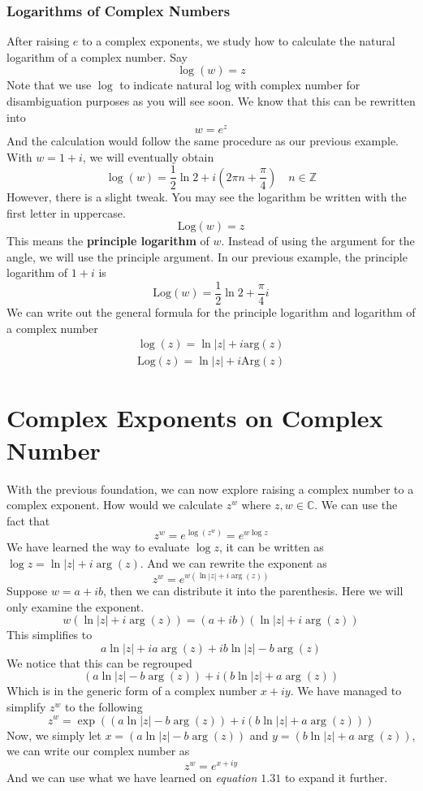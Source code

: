 \documentclass[12pt]{book}
\newcommand{\Z}{\mathbb{Z}}
\newcommand{\C}{\mathbb{C}}
\newcommand{\paren}[1]{\left( #1 \right)}
\newcommand{\abso}[1]{\left|#1 \right|}
\begin{document}
\subsubsection{Logarithms of Complex Numbers}
After raising $e$ to a complex exponents, we study how to calculate the natural logarithm of a complex number. Say
\begin{equation}
  \log\paren{w}=z 
\end{equation}
Note that we use $\log$ to indicate natural log with complex number for disambiguation purposes as you will see soon. We know that this can be rewritten into 
\[
w = e^z
\]
And the calculation would follow the same procedure as our previous example. With $w = 1+i$, we will eventually obtain 
\[
\log(w) = \frac{1}{2}\ln 2 + i \paren{2\pi n + \frac{\pi}{4}} \quad n\in \Z
\]
However, there is a slight tweak. You may see the logarithm be written with the first letter in uppercase.
\[
\text{Log}(w) = z
\]
This means the \textbf{principle logarithm} of $w$. Instead of using the argument for the angle, we will use the principle argument. In our previous example, the principle logarithm of $1+i$ is 
\[
\text{Log}(w) = \frac{1}{2}\ln 2 + \frac{\pi}{4}i
\]
We can write out the general formula for the principle logarithm and logarithm of a complex number
\begin{align}
    \log(z) = \ln \abso{z} + i \text{arg}(z)\\
    \text{Log}(z) = \ln \abso{z} + i \text{Arg}(z)
\end{align}


\section{Complex Exponents on Complex Number}
With the previous foundation, we can now explore raising a complex number to a complex exponent. How would we calculate $z^w$ where $ z,w \in \C$. We can use the fact that
\[
z^w = e^{\log\paren{z^w}} = e^{w\log z}
\]
We have learned the way to evaluate $\log z$, it can be written as $ \log z = \ln \abso{z} + i\arg(z)$. And we can rewrite the exponent as
\[
z^w = e^{w \paren{\ln \abso{z} + i\arg (z)}}
\]
Suppose $w = a+ib$, then we can distribute it into the parenthesis. Here we will only examine the exponent.
\[
w \paren{\ln \abso{z} + i\arg (z)}= \paren{a+ib} \paren{\ln \abso{z} + i\arg (z)} 
\]
This simplifies to
\[
a\ln\abso{z}+ia\arg(z) + ib\ln\abso{z}-b\arg(z)
\]
We notice that this can be regrouped
\[
\paren{a\ln\abso{z}- b\arg(z)} + i\paren{b\ln\abso{z} +a\arg(z) }
\]
Which is in the generic form of a complex number $x + iy$. We have managed to simplify $z^w$ to the following
\[
z^w = \exp\paren{\paren{a\ln\abso{z}- b\arg(z)} + i\paren{b\ln\abso{z} +a\arg(z) }}
\]
Now, we simply let $x = \paren{a\ln\abso{z}- b\arg(z)}$ and $y = \paren{b\ln\abso{z} +a\arg(z) } $, we can write our complex number as
\[
z^w = e^{x+iy}
\]
And we can use what we have learned on\textit{ equation $1.31$ }to expand it further. 
\end{document}
